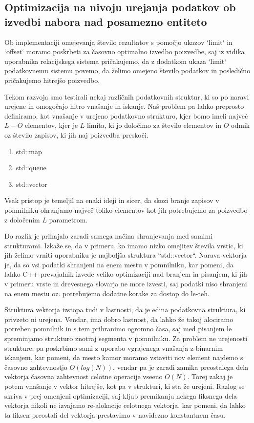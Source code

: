 \documentclass[a4paper,12pt,openright]{book}
\begin{document}
        \subsection{Optimizacija na nivoju urejanja podatkov ob izvedbi nabora nad posamezno entiteto}

        Ob implementaciji omejevanja število rezultatov s pomočjo ukazov `limit` in `offset` moramo poskrbeti za časovno optimalno izvedbo poizvedbe, saj iz vidika uporabnika relacijskega sistema pričakujemo, da z dodatkom ukaza `limit` podatkovnemu sistemu povemo, da želimo omejeno število podatkov in posledično pričakujemo hitrejšo poizvedbo.

        Tekom razvoja smo testirali nekaj različnih podatkovnih struktur, ki so po naravi urejene in omogočajo hitro vnašanje in iskanje. Naš problem pa lahko preprosto definiramo, kot vnašanje v urejeno podatkovno strukturo, kjer bomo imeli največ $L - O$ elementov, kjer je $L$ limita, ki jo določimo za število elementov in $O$ odmik oz število zapisov, ki jih naj poizvedba preskoči.

        \begin{enumerate}
            \item std::map \cite{CPP_MAP}
            \item std::queue \cite{CPP_QUEUE}
            \item std::vector \cite{CPP_VECTOR}
        \end{enumerate}

        \noindent
        Vsak pristop je temeljil na enaki ideji in sicer, da skozi branje zapisov v pomnilniku ohranjamo največ toliko elementov kot jih potrebujemo za poizvedbo z določenim $L$ parametrom.

        Do razlik je prihajalo zaradi samega načina shranjevanja med samimi strukturami. Izkaže se, da v primeru, ko imamo nizko omejitev števila vrstic, ki jih želimo vrniti uporabniku je najboljša struktura ``std::vector``. Narava vektorja je, da so vsi podatki shranjeni na enem mestu v pomnilniku, kar pomeni, da lahko C++ prevajalnik izvede veliko optimizaciji nad branjem in pisanjem, ki jih v primeru vrste in drevesnega slovarja ne more izvesti, saj podatki niso shranjeni na enem mestu oz. potrebujemo dodatne korake za dostop do le-teh.

        Struktura vektorja izstopa tudi v lastnosti, da je edina podatkovna struktura, ki privzeto ni urejena. Vendar, ima dobro lastnost, da lahko že takoj alociramo potreben pomnilnik in s tem prihranimo ogromno časa, saj med pisanjem le spreminjamo strukturo znotraj segmenta v pomnilniku. Za problem ne urejenosti strukture, pa poskrbimo sami z uporabo vgrajenega vnašanja z binarnim iskanjem, kar pomeni, da mesto kamor moramo vstaviti nov element najdemo s časovno zahtevnostjo $O(log(N))$, vendar pa je zaradi zamika preostalega dela vektorja časovna zahtevnost celotne operacije vseeno $O(N)$. Torej zakaj je potem vnašanje v vektor hitrejše, kot pa v strukturi, ki sta že urejeni. Razlog se skriva v prej omenjeni optimizaciji, saj kljub premikanju nekega fiksnega dela vektorja nikoli ne izvajamo re-alokacije celotnega vektorja, kar pomeni, da lahko ta fiksen preostali del vektorja prestavimo v navidezno konstantnem času. 
\end{document}
